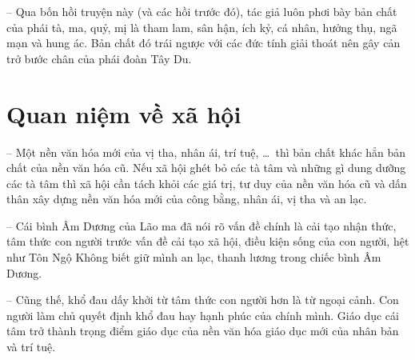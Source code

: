 -- Qua bốn hồi truyện này (và các hồi trước đó), tác giả luôn phơi bày bản chất của phái tà, ma, quỷ, mị là tham lam, sân hận, ích kỷ, cá nhân, hưởng thụ, ngã mạn và hung ác. Bản chất đó trái ngược với các đức tính giải thoát nên gây cản trở bước chân của phái đoàn Tây Du.

\section{Quan niệm về xã hội} %
\label{sec:74_75_xa_hoi}

-- Một nền văn hóa mới của vị tha, nhân ái, trí tuệ, \ldots ~thì bản chất khác hẳn bản chất của nền văn hóa cũ. Nếu xã hội ghét bỏ các tà tâm và những gì dung dưỡng các tà tâm thì xã hội cần tách khỏi các giá trị, tư duy của nền văn hóa cũ và dấn thân xây dựng nền văn hóa mới của công bằng, nhân ái, vị tha và an lạc.

-- Cái bình Âm Dương của Lão ma đã nói rõ vấn đề chính là cải tạo nhận thức, tâm thức con người trước vấn đề cải tạo xã hội, điều kiện sống của con người, hệt như Tôn Ngộ Không biết giữ mình an lạc, thanh lương trong chiếc bình Âm Dương.

-- Cũng thế, khổ đau dấy khởi từ tâm thức con người hơn là từ ngoại cảnh. Con người làm chủ quyết định khổ đau hay hạnh phúc của chính mình. Giáo dục cái tâm trở thành trọng điểm giáo dục của nền văn hóa giáo dục mới của nhân bản và trí tuệ.
